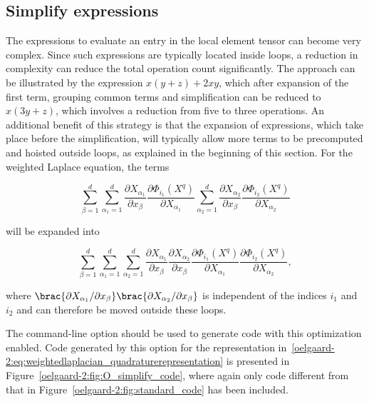 \subsection{Simplify expressions}
\label{oelgaard-2:sec:simplify_expressions}

The expressions to evaluate an entry in the local element tensor can
become very complex. Since such expressions are typically located
inside loops, a reduction in complexity can reduce the total operation
count significantly.  The approach can be illustrated by the
expression $x (y + z) + 2 x y$, which after expansion of the first
term, grouping common terms and simplification can be reduced to $x (3
y + z)$, which involves a reduction from five to three operations.  An
additional benefit of this strategy is that the expansion of
expressions, which take place before the simplification, will
typically allow more terms to be precomputed and hoisted outside
loops, as explained in the beginning of this section.  For the
weighted Laplace equation, the terms

\begin{equation}
  \sum_{\beta=1}^d
  \sum_{\alpha_1=1}^d
    \frac{\partial X_{\alpha_1}}{\partial x_{\beta}}
    \frac{\partial \Phi_{i_1}(X^q)}{\partial X_{\alpha_1}}
  \sum_{\alpha_2=1}^d
    \frac{\partial X_{\alpha_2}}{\partial x_{\beta}}
    \frac{\partial \Phi_{i_2}(X^q)}{\partial X_{\alpha_2}}
\end{equation}

will be expanded into

\begin{equation}
  \sum_{\beta=1}^d
  \sum_{\alpha_1=1}^d
  \sum_{\alpha_2=1}^d
  \frac{\partial X_{\alpha_1}}{\partial x_{\beta}}
  \frac{\partial X_{\alpha_2}}{\partial x_{\beta}}
  \frac{\partial \Phi_{i_1}(X^q)}{\partial X_{\alpha_1}}
  \frac{\partial \Phi_{i_2}(X^q)}{\partial X_{\alpha_2}},
\end{equation}

where $\brac{\partial X_{\alpha_1} / \partial x_{\beta}}
\brac{\partial X_{\alpha_2} / \partial x_{\beta}}$ is independent of
the indices $i_1$ and $i_2$ and can therefore be moved outside these
loops.

The \ffc{} command-line option  should
be used to generate code with this optimization enabled.  Code
generated by this option for the representation
in~\eqref{oelgaard-2:eq:weightedlaplacian_quadraturerepresentation} is
presented in Figure~\ref{oelgaard-2:fig:O_simplify_code}, where again
only code different from that in
Figure~\ref{oelgaard-2:fig:standard_code} has been included.

